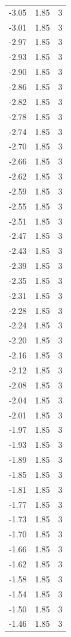 \begin{longtable}{lrr}
  -3.05 & 1.85 & 3 \\
  -3.01 & 1.85 & 3 \\
  -2.97 & 1.85 & 3 \\
  -2.93 & 1.85 & 3 \\
  -2.90 & 1.85 & 3 \\
  -2.86 & 1.85 & 3 \\
  -2.82 & 1.85 & 3 \\
  -2.78 & 1.85 & 3 \\
  -2.74 & 1.85 & 3 \\
  -2.70 & 1.85 & 3 \\
  -2.66 & 1.85 & 3 \\
  -2.62 & 1.85 & 3 \\
  -2.59 & 1.85 & 3 \\
  -2.55 & 1.85 & 3 \\
  -2.51 & 1.85 & 3 \\
  -2.47 & 1.85 & 3 \\
  -2.43 & 1.85 & 3 \\
  -2.39 & 1.85 & 3 \\
  -2.35 & 1.85 & 3 \\
  -2.31 & 1.85 & 3 \\
  -2.28 & 1.85 & 3 \\
  -2.24 & 1.85 & 3 \\
  -2.20 & 1.85 & 3 \\
  -2.16 & 1.85 & 3 \\
  -2.12 & 1.85 & 3 \\
  -2.08 & 1.85 & 3 \\
  -2.04 & 1.85 & 3 \\
  -2.01 & 1.85 & 3 \\
  -1.97 & 1.85 & 3 \\
  -1.93 & 1.85 & 3 \\
  -1.89 & 1.85 & 3 \\
  -1.85 & 1.85 & 3 \\
  -1.81 & 1.85 & 3 \\
  -1.77 & 1.85 & 3 \\
  -1.73 & 1.85 & 3 \\
  -1.70 & 1.85 & 3 \\
  -1.66 & 1.85 & 3 \\
  -1.62 & 1.85 & 3 \\
  -1.58 & 1.85 & 3 \\
  -1.54 & 1.85 & 3 \\
  -1.50 & 1.85 & 3 \\
  -1.46 & 1.85 & 3 \\

\end{longtable}
